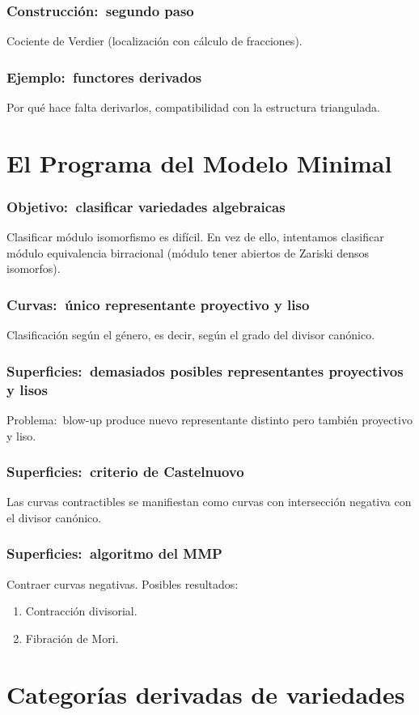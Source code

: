 \documentclass[12pt]{beamer}
\begin{document}
\begin{frame}
  \frametitle{Construcción:~segundo paso}
  Cociente de Verdier (localización con cálculo de fracciones).
\end{frame}

\begin{frame}
  \frametitle{Ejemplo:~functores derivados}
  Por qué hace falta derivarlos, compatibilidad con la estructura triangulada.
\end{frame}

\section{El Programa del Modelo Minimal}

\begin{frame}
  \frametitle{Objetivo:~clasificar variedades algebraicas}
  Clasificar módulo isomorfismo es difícil.
  En vez de ello, intentamos clasificar módulo equivalencia birracional (módulo tener abiertos de Zariski densos isomorfos).
\end{frame}

\begin{frame}
  \frametitle{Curvas:~único representante proyectivo y liso}
  Clasificación según el género, es decir, según el grado del divisor canónico.
\end{frame}

\begin{frame}
  \frametitle{Superficies:~demasiados posibles representantes proyectivos y lisos}
  Problema:~blow-up produce nuevo representante distinto pero también proyectivo y liso.
\end{frame}

\begin{frame}
  \frametitle{Superficies:~criterio de Castelnuovo}
  Las curvas contractibles se manifiestan como curvas con intersección negativa con el divisor canónico.
\end{frame}

\begin{frame}
  \frametitle{Superficies:~algoritmo del MMP}
  Contraer curvas negativas.
  Posibles resultados:
  \begin{enumerate}
    \item Contracción divisorial.
    \item Fibración de Mori.
  \end{enumerate}
\end{frame}

\section{Categorías derivadas de variedades}
\end{document}
